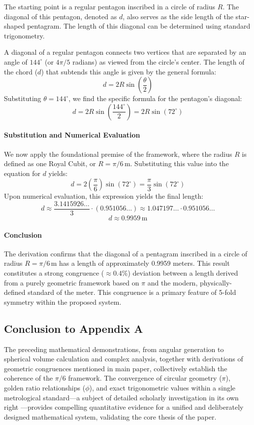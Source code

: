 \documentclass[11pt]{article}
\begin{document}
The starting point is a regular pentagon inscribed in a circle of radius $R$. The diagonal of this pentagon, denoted as $d$, also serves as the side length of the star-shaped pentagram. The length of this diagonal can be determined using standard trigonometry.

A diagonal of a regular pentagon connects two vertices that are separated by an angle of $144^\circ$ (or $4\pi/5$ radians) as viewed from the circle's center. The length of the chord ($d$) that subtends this angle is given by the general formula:
\[
d = 2R \sin\left(\frac{\theta}{2}\right)
\]
Substituting $\theta = 144^\circ$, we find the specific formula for the pentagon's diagonal:
\[
d = 2R \sin\left(\frac{144^\circ}{2}\right) = 2R \sin(72^\circ)
\]

\paragraph{Substitution and Numerical Evaluation}

We now apply the foundational premise of the framework, where the radius $R$ is defined as one Royal Cubit, or $R = \pi/6\,\text{m}$. Substituting this value into the equation for $d$ yields:
\[
d = 2 \left( \frac{\pi}{6} \right) \sin(72^\circ) = \frac{\pi}{3} \sin(72^\circ)
\]
Upon numerical evaluation, this expression yields the final length:
\[
d \approx \frac{3.1415926\dots}{3} \cdot (0.951056\dots) \approx 1.047197\dots \cdot 0.951056\dots
\]
\[
d \approx 0.9959\,\text{m}
\]

\paragraph{Conclusion}

The derivation confirms that the diagonal of a pentagram inscribed in a circle of radius $R = \pi/6\,\text{m}$ has a length of approximately 0.9959 meters. This result constitutes a strong congruence ($\approx0.4\%$) deviation between a length derived from a purely geometric framework based on $\pi$ and the modern, physically-defined standard of the meter. This congruence is a primary feature of 5-fold symmetry within the proposed system.



\subsection*{Conclusion to Appendix A}
The preceding mathematical demonstrations, from angular generation to spherical volume calculation and complex analysis, together with derivations of geometric congruences mentioned in main paper, collectively establish the coherence of the $\pi/6$ framework. The convergence of circular geometry ($\pi$), golden ratio relationships ($\phi$), and exact trigonometric values within a single metrological standard---a subject of detailed scholarly investigation in its own right \cite{herz-fischler2000shape}---provides compelling quantitative evidence for a unified and deliberately designed mathematical system, validating the core thesis of the paper.
\end{document}
